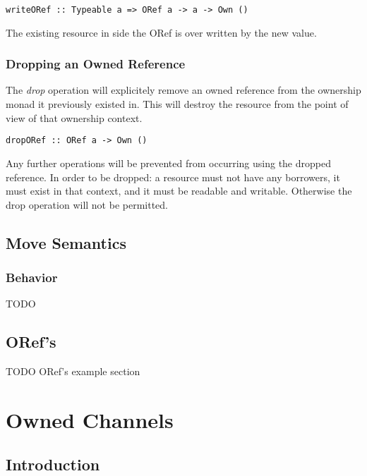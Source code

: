 \documentclass[onehalf,11pt]{beavtex}
\begin{document}
\begin{verbatim}
writeORef :: Typeable a => ORef a -> a -> Own ()
\end{verbatim}

The existing resource in side the ORef is over written by the new value.

\subsection{Dropping an Owned Reference}

The \textit{drop} operation will explicitely remove an owned reference from the
ownership monad it previously existed in.
This will destroy the resource from the point of view of that ownership context.

\begin{verbatim}
dropORef :: ORef a -> Own ()
\end{verbatim}

Any further operations will be prevented from occurring using the dropped
reference. In order to be dropped: a resource must not have any borrowers,
it must exist in that context,
and it must be readable and writable.
Otherwise the drop operation will not be permitted.

\section{Move Semantics}

\subsection{Behavior}

TODO


\section{ORef's}

TODO ORef's example section


\chapter{Owned Channels}

\section{Introduction}
\end{document}
